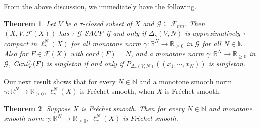 \documentclass[11pt]{amsart}
\newtheorem{thm}{Theorem}[section]
\newcommand{\ra}{\rightarrow}
\newcommand{\ci}{\subseteq}
\newcommand{\De}{\Delta}
\newcommand{\ga}{\gamma}
\newcommand{\mb}{\mathbb}
\newcommand{\mc}{\mathcal}
\newcommand{\mr}{\mathscr}
\newcommand{\emC}{\emph{Cent}}
\newcommand{\eSACP}{\bf{\emph{SACP}}}
\begin{document}
From the above discussion, we immediately have the following.
\begin{thm}\label{T2}
Let $V$ be a $\tau$-closed subset of $X$ and $\mr{G}\ci\mr{F}_{mn}$. Then $(X,V,\mc{F}(X))$ has $\tau$-$\mr{G}$-$\eSACP$ if and only if $\De_\ga(V,N)$ is approximatively $\tau$-compact in $\ell_\ga^N(X)$ for all monotone norm  $\ga:\mb{R}^N\ra\mb{R}_{\geq0}$ in $\mr{G}$ for all $N\in\mb{N}$. Also for $F\in\mc{F}(X)$ with $card(F)=N$, and a monotone norm $\ga:\mb{R}^N\ra\mb{R}_{\geq0}$ in $\mr{G}$, $\emC_V^\ga(F)$ is singleton if and only if $P_{\De_\ga(V,N)}((x_1,\cdots,x_N))$ is singleton.
\end{thm}
Our next result shows that for every $N\in\mb{N}$ and a monotone smooth norm $\ga:\mb{R}^N\ra\mb{R}_{\geq0}$, $\ell_\ga^N(X)$ is Fr\'echet smooth, when $X$ is Fr\'echet smooth.
\begin{thm}\label{T3}
Suppose $X$ is Fr\'echet smooth. Then for every $N\in\mb{N}$ and monotone smooth norm $\ga:\mb{R}^N\ra\mb{R}_{\geq0}$, $\ell_\ga^N(X)$ is Fr\'echet smooth.
\end{thm}
\end{document}
